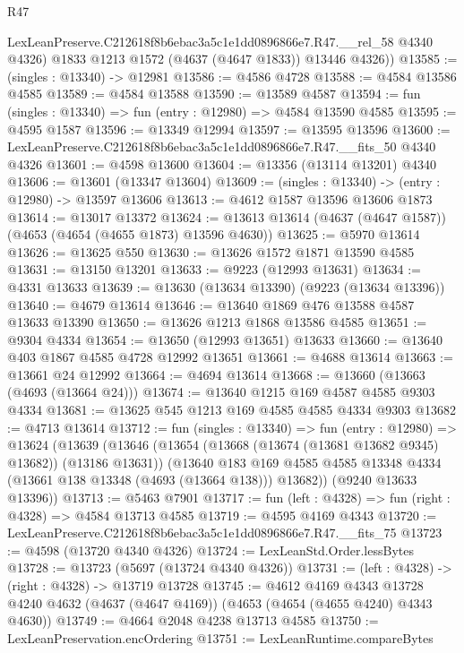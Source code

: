 \begin{lexlean}{R47}
\begin{coremodule}
        LexLeanPreserve.C212618f8b6ebac3a5c1e1dd0896866e7.R47.__rel_58 @4340 @4326)
        @1833
        @1213
        @1572
        (@4637 (@4647 @1833))
        @13446
        @4326))
@13585 := (singles : @13340) -> @12981
@13586 := @4586 @4728
@13588 := @4584 @13586 @4585
@13589 := @4584 @13588
@13590 := @13589 @4587
@13594 := fun (singles : @13340) => fun (entry : @12980) => @4584 @13590 @4585
@13595 := @4595 @1587
@13596 := @13349 @12994
@13597 := @13595 @13596
@13600 := LexLeanPreserve.C212618f8b6ebac3a5c1e1dd0896866e7.R47.__fits_50 @4340 @4326
@13601 := @4598 @13600
@13604 := @13356 (@13114 @13201) @4340
@13606 := @13601 (@13347 @13604)
@13609 := (singles : @13340) -> (entry : @12980) -> @13597 @13606
@13613 := @4612 @1587 @13596 @13606 @1873
@13614 := @13017 @13372
@13624 := @13613 @13614 (@4637 (@4647 @1587)) (@4653 (@4654 (@4655 @1873) @13596 @4630))
@13625 := @5970 @13614
@13626 := @13625 @550
@13630 := @13626 @1572 @1871 @13590 @4585
@13631 := @13150 @13201
@13633 := @9223 (@12993 @13631)
@13634 := @4331 @13633
@13639 := @13630 (@13634 @13390) (@9223 (@13634 @13396))
@13640 := @4679 @13614
@13646 := @13640 @1869 @476 @13588 @4587 @13633 @13390
@13650 := @13626 @1213 @1868 @13586 @4585
@13651 := @9304 @4334
@13654 := @13650 (@12993 @13651) @13633
@13660 := @13640 @403 @1867 @4585 @4728 @12992 @13651
@13661 := @4688 @13614
@13663 := @13661 @24 @12992
@13664 := @4694 @13614
@13668 := @13660 (@13663 (@4693 (@13664 @24)))
@13674 := @13640 @1215 @169 @4587 @4585 @9303 @4334
@13681 := @13625 @545 @1213 @169 @4585 @4585 @4334 @9303
@13682 := @4713 @13614
@13712 := fun (singles : @13340) =>
  fun (entry : @12980) =>
  @13624
    (@13639
      (@13646
        (@13654 (@13668 (@13674 (@13681 @13682 @9345) @13682)) (@13186 @13631))
        (@13640
          @183
          @169
          @4585
          @4585
          @13348
          @4334
          (@13661 @138 @13348 (@4693 (@13664 @138)))
          @13682))
      (@9240 @13633 @13396))
@13713 := @5463 @7901
@13717 := fun (left : @4328) => fun (right : @4328) => @4584 @13713 @4585
@13719 := @4595 @4169 @4343
@13720 := LexLeanPreserve.C212618f8b6ebac3a5c1e1dd0896866e7.R47.__fits_75
@13723 := @4598 (@13720 @4340 @4326)
@13724 := LexLeanStd.Order.lessBytes
@13728 := @13723 (@5697 (@13724 @4340 @4326))
@13731 := (left : @4328) -> (right : @4328) -> @13719 @13728
@13745 := @4612
    @4169
    @4343
    @13728
    @4240
    @4632
    (@4637 (@4647 @4169))
    (@4653 (@4654 (@4655 @4240) @4343 @4630))
@13749 := @4664 @2048 @4238 @13713 @4585
@13750 := LexLeanPreservation.encOrdering
@13751 := LexLeanRuntime.compareBytes

\end{coremodule}
\end{lexlean}
